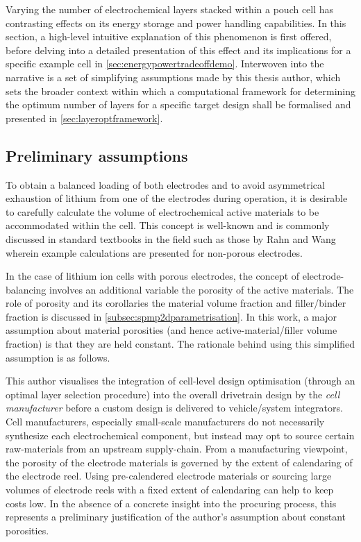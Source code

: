 Varying the  number of electrochemical  layers stacked  within a pouch  cell has
contrasting effects  on its energy  storage and power handling  capabilities. In
this section,  a high-level  intuitive explanation of  this phenomenon  is first
offered, before  delving into  a detailed  presentation of  this effect  and its
implications for a specific  example cell in \cref{sec:energypowertradeoffdemo}.
Interwoven into the  narrative is a set of simplifying  assumptions made by this
thesis  author, which  sets the  broader  context within  which a  computational
framework for  determining the optimum  number of  layers for a  specific target
design shall be formalised and presented in \cref{sec:layeroptframework}.

\subsection{Preliminary assumptions}\label{subsec:layeroptassumptions}

To  obtain a  balanced  loading of  both electrodes  and  to avoid  asymmetrical
exhaustion  of lithium  from  one  of the  electrodes  during  operation, it  is
desirable to carefully calculate the  volume of electrochemical active materials
to be accommodated  within the cell. This concept is  well-known and is commonly
discussed  in  standard  textbooks in  the  field  such  as  those by  Rahn  and
Wang~\cite{Rahn2013} wherein  example calculations are presented  for non-porous
electrodes.

In  the  case  of  lithium  ion   cells  with  porous  electrodes,  the  concept
of  electrode-balancing  involves an  additional  variable  \viz{} the  porosity
of  the  active materials.  The  role  of  porosity  and its  corollaries  \ie{}
the  material  volume  fraction  and  filler/binder  fraction  is  discussed  in
\cref{subsec:spmp2dparametrisation}.  In this  work,  a  major assumption  about
material porosities  (and hence active-material/filler volume  fraction) is that
they are held constant. The rationale behind using this simplified assumption is
as follows.

This  author  visualises  the  integration  of  cell-level  design  optimisation
(through  an optimal  layer  selection procedure)  into  the overall  drivetrain
design  by the  \emph{cell manufacturer}  before  a custom  design is  delivered
to  vehicle/system  integrators.   Cell  manufacturers,  especially  small-scale
manufacturers do not necessarily  synthesize each electrochemical component, but
instead may opt  to source certain raw-materials from  an upstream supply-chain.
From  a  manufacturing  viewpoint,  the  porosity  of  the  electrode  materials
is  governed  by  the  extent  of  calendaring  of  the  electrode  reel.  Using
pre-calendered electrode materials or sourcing  large volumes of electrode reels
with a fixed extent of calendaring can help to keep costs low. In the absence of
a concrete  insight into  the procuring process,  this represents  a preliminary
justification of the author's assumption about constant porosities.

